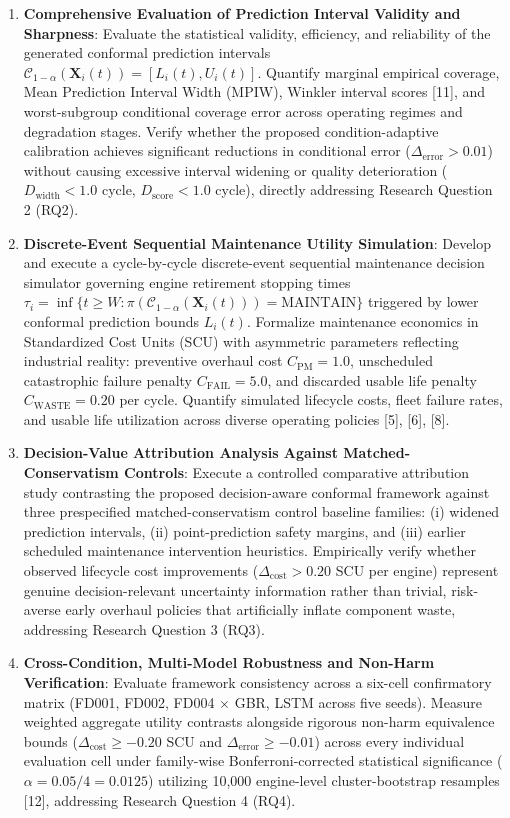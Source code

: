\documentclass[12pt,a4paper]{article}
\begin{document}
\begin{enumerate}
    \item \textbf{Comprehensive Evaluation of Prediction Interval Validity and Sharpness}: Evaluate the statistical validity, efficiency, and reliability of the generated conformal prediction intervals $\mathcal{C}_{1-\alpha}(\mathbf{X}_i(t)) = [L_i(t), U_i(t)]$. Quantify marginal empirical coverage, Mean Prediction Interval Width (MPIW), Winkler interval scores [11], and worst-subgroup conditional coverage error across operating regimes and degradation stages. Verify whether the proposed condition-adaptive calibration achieves significant reductions in conditional error ($\Delta_{\text{error}} > 0.01$) without causing excessive interval widening or quality deterioration ($D_{\text{width}} < 1.0$ cycle, $D_{\text{score}} < 1.0$ cycle), directly addressing Research Question 2 (RQ2).
    
    \item \textbf{Discrete-Event Sequential Maintenance Utility Simulation}: Develop and execute a cycle-by-cycle discrete-event sequential maintenance decision simulator governing engine retirement stopping times $\tau_i = \inf \{ t \ge W : \pi(\mathcal{C}_{1-\alpha}(\mathbf{X}_i(t))) = \text{MAINTAIN} \}$ triggered by lower conformal prediction bounds $L_i(t)$. Formalize maintenance economics in Standardized Cost Units (SCU) with asymmetric parameters reflecting industrial reality: preventive overhaul cost $C_{\text{PM}} = 1.0$, unscheduled catastrophic failure penalty $C_{\text{FAIL}} = 5.0$, and discarded usable life penalty $C_{\text{WASTE}} = 0.20$ per cycle. Quantify simulated lifecycle costs, fleet failure rates, and usable life utilization across diverse operating policies [5], [6], [8].
    
    \item \textbf{Decision-Value Attribution Analysis Against Matched-Conservatism Controls}: Execute a controlled comparative attribution study contrasting the proposed decision-aware conformal framework against three prespecified matched-conservatism control baseline families: (i) widened prediction intervals, (ii) point-prediction safety margins, and (iii) earlier scheduled maintenance intervention heuristics. Empirically verify whether observed lifecycle cost improvements ($\Delta_{\text{cost}} > 0.20$ SCU per engine) represent genuine decision-relevant uncertainty information rather than trivial, risk-averse early overhaul policies that artificially inflate component waste, addressing Research Question 3 (RQ3).
    
    \item \textbf{Cross-Condition, Multi-Model Robustness and Non-Harm Verification}: Evaluate framework consistency across a six-cell confirmatory matrix (FD001, FD002, FD004 $\times$ GBR, LSTM across five seeds). Measure weighted aggregate utility contrasts alongside rigorous non-harm equivalence bounds ($\Delta_{\text{cost}} \ge -0.20$ SCU and $\Delta_{\text{error}} \ge -0.01$) across every individual evaluation cell under family-wise Bonferroni-corrected statistical significance ($\alpha = 0.05 / 4 = 0.0125$) utilizing 10,000 engine-level cluster-bootstrap resamples [12], addressing Research Question 4 (RQ4).
    

\end{enumerate}
\end{document}
